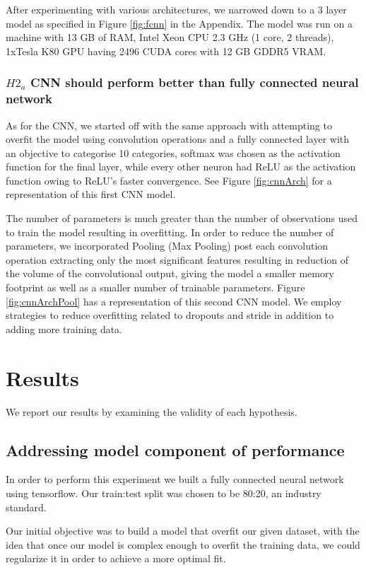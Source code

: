 \documentclass[12pt]{article}
\begin{document}
After experimenting with various architectures, we narrowed down to a 3 layer
model as specified in Figure \ref{fig:fcnn} in the Appendix. The model was
run on a machine with 13 GB of RAM, Intel Xeon CPU 2.3 GHz (1 core, 2
threads), 1xTesla K80 GPU having 2496 CUDA cores with 12 GB GDDR5 VRAM.

\subsubsection{$H2_a$ CNN should perform better than fully connected neural
  network}

As for the CNN, we started off with the same approach with attempting
to overfit the model using convolution operations and a fully connected
layer with an objective to categorise 10 categories, softmax was chosen
as the activation function for the final layer, while every other neuron
had ReLU as the activation function owing to ReLU’s faster convergence. See
Figure \ref{fig:cnnArch} for a representation of this first CNN model.

The number of parameters is much greater than the number of observations
used to train the model resulting in overfitting. In order to reduce the
number of parameters, we incorporated Pooling (Max Pooling) post each
convolution operation extracting only the most significant features
resulting in reduction of the volume of the convolutional output, giving
the model a smaller memory footprint as well as a smaller number of
trainable parameters. Figure \ref{fig:cnnArchPool} has a representation of this
second CNN model. We employ strategies to reduce overfitting related to
dropouts and stride in addition to adding more training data.

\section{Results}

We report our results by examining the validity of each hypothesis.

\subsection{Addressing model component of performance}

In order to perform this experiment we built a fully connected neural network
using tensorflow. Our train:test split was chosen to be 80:20, an industry
standard. 

Our initial objective was to build a model that overfit our given dataset,
with the idea that once our model is complex enough to overfit the training
data, we could regularize it in order to achieve a more optimal fit.
\end{document}

